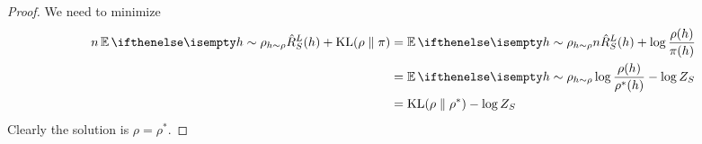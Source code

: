 \begin{proof}
  We need to minimize
  \begin{equation}
    \begin{split}
      n \Ev[h \sim \rho]{\hat{R}_S^L(h)} + \KL{\rho}{\pi}
      &= \Ev[h \sim \rho]{n \hat{R}_S^L(h) + \log\frac{\rho(h)}{\pi(h)}} \\
      &= \Ev[h \sim \rho]{\log\frac{\rho(h)}{\rho^*(h)}} - \log Z_S \\
      &= \KL{\rho}{\rho^*} - \log Z_S
    \end{split}
  \end{equation}
  Clearly the solution is $\rho = \rho^*$.
\end{proof}
